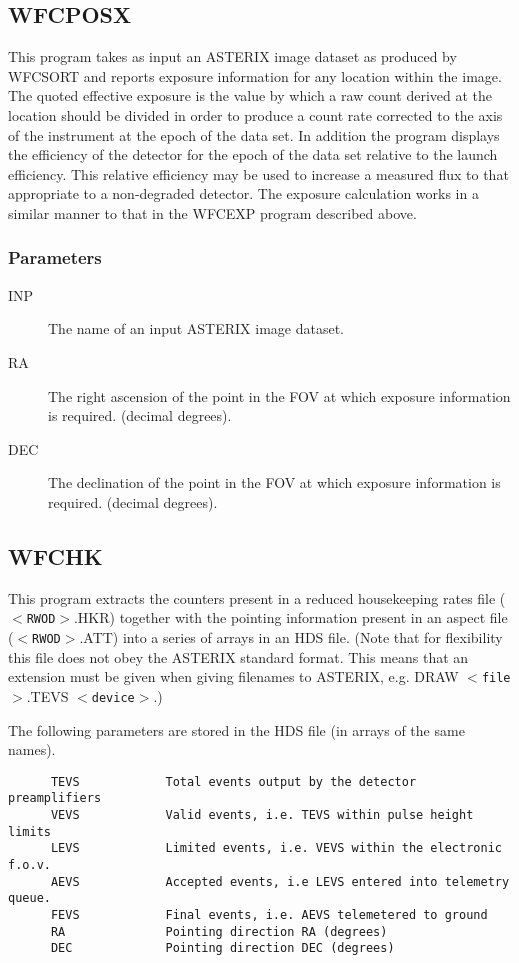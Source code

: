\subsection{WFCPOSX}

This program takes as input an ASTERIX image dataset as produced by WFCSORT
and reports exposure information for any location within the image.
The quoted effective exposure is the value by which a raw count derived
at the location should be divided in order to produce a count rate 
corrected to the axis of the instrument at the epoch of the data set.
In addition the program displays the efficiency of the detector for the
epoch of the data set relative to the launch efficiency. This relative
efficiency may be used to increase a measured flux to that appropriate 
to a non-degraded detector. The exposure calculation works in a similar manner
to that in the WFCEXP program described above.
\subsubsection{Parameters}
\begin{description}
\item[INP]
The name of an input ASTERIX image dataset.
\item[RA]
The right ascension of the point in the FOV at which exposure information
is required. (decimal degrees).
\item[DEC]
The declination of the point in the FOV at which exposure information
is required. (decimal degrees).
\end{description}

\subsection{WFCHK}
\label{se:wfchk}

This program extracts the counters present in a reduced
housekeeping rates file ($<${\tt RWOD}$>$.HKR) together with the
pointing information present in an aspect file ($<${\tt RWOD}$>$.ATT) 
into a series of arrays in an HDS 
file. (Note that for flexibility this file does not obey
the ASTERIX standard format. This means that an 
extension must be given when giving filenames to ASTERIX, 
e.g. DRAW $<${\tt file}$>$.TEVS $<${\tt device}$>$.)

 The following parameters are stored in the HDS file (in arrays
of the same names).
\begin{verbatim}
      TEVS            Total events output by the detector preamplifiers
      VEVS            Valid events, i.e. TEVS within pulse height limits
      LEVS            Limited events, i.e. VEVS within the electronic f.o.v.
      AEVS            Accepted events, i.e LEVS entered into telemetry queue.
      FEVS            Final events, i.e. AEVS telemetered to ground
      RA              Pointing direction RA (degrees)
      DEC             Pointing direction DEC (degrees)
\end{verbatim}

